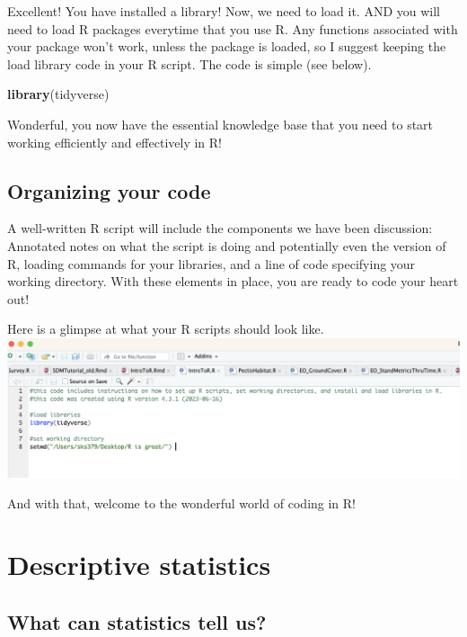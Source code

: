 \documentclass[
]{book}
\newenvironment{Shaded}{\begin{snugshade}}{\end{snugshade}}
\newcommand{\FunctionTok}[1]{\textcolor[rgb]{0.13,0.29,0.53}{\textbf{#1}}}
\newcommand{\NormalTok}[1]{#1}
\begin{document}
Excellent! You have installed a library! Now, we need to load it. AND you will need to load R packages everytime that you use R. Any functions associated with your package won't work, unless the package is loaded, so I suggest keeping the load library code in your R script. The code is simple (see below).

\begin{Shaded}
\begin{Highlighting}[]
\FunctionTok{library}\NormalTok{(tidyverse)}
\end{Highlighting}
\end{Shaded}

Wonderful, you now have the essential knowledge base that you need to start working efficiently and effectively in R!

\hypertarget{organizing-your-code}{%
\section{Organizing your code}\label{organizing-your-code}}

A well-written R script will include the components we have been discussion: Annotated notes on what the script is doing and potentially even the version of R, loading commands for your libraries, and a line of code specifying your working directory. With these elements in place, you are ready to code your heart out!

Here is a glimpse at what your R scripts should look like.
\includegraphics{images:/01-intro/RScriptSetUp.png}

And with that, welcome to the wonderful world of coding in R!

\hypertarget{descriptive-statistics}{%
\chapter{Descriptive statistics}\label{descriptive-statistics}}

\hypertarget{what-can-statistics-tell-us}{%
\section{What can statistics tell us?}\label{what-can-statistics-tell-us}}
\end{document}
